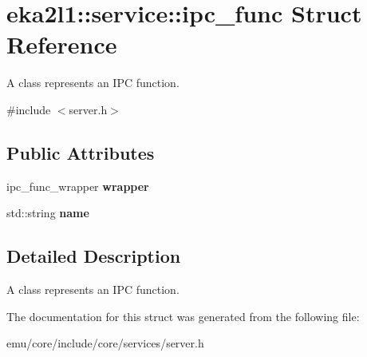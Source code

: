 \hypertarget{structeka2l1_1_1service_1_1ipc__func}{}\section{eka2l1\+:\+:service\+:\+:ipc\+\_\+func Struct Reference}
\label{structeka2l1_1_1service_1_1ipc__func}


A class represents an I\+PC function.  




{\ttfamily \#include $<$server.\+h$>$}

\subsection*{Public Attributes}
\begin{DoxyCompactItemize}
\item 
\mbox{\label{structeka2l1_1_1service_1_1ipc__func_a1b2ea561d2faf7572751f82bdf589648}} 
ipc\+\_\+func\+\_\+wrapper {\bfseries wrapper}
\item 
\mbox{\label{structeka2l1_1_1service_1_1ipc__func_a23edf81382d1311e2a4862a2143b8f27}} 
std\+::string {\bfseries name}
\end{DoxyCompactItemize}


\subsection{Detailed Description}
A class represents an I\+PC function. 

The documentation for this struct was generated from the following file\+:\begin{DoxyCompactItemize}
\item 
emu/core/include/core/services/server.\+h\end{DoxyCompactItemize}
